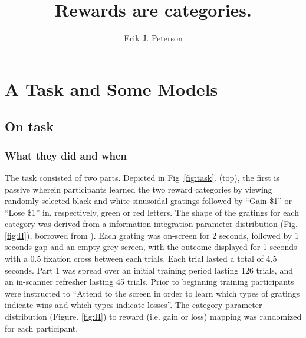 \documentclass[doc,12pt]{apa}        %
\title{Rewards are categories.}
\author{Erik J. Peterson} \affiliation{Dept. of Psychology \\ Colorado State University \\ Fort Collins, CO}
\begin{document}
 
\maketitle

\section{A Task and Some Models} %
\label{sec:task_and_models}

\subsection{On task}
\label{to_task}
\subsubsection{What they did and when}
\label{what_when}
The task consisted of two parts.  Depicted in Fig~\ref{fig:task}. (top), the first is passive wherein participants learned the two reward categories by viewing randomly selected black and white sinusoidal gratings followed by ``Gain \$1'' or ``Lose \$1'' in, respectively, green or red letters.  The shape of the gratings for each category was derived from a information integration parameter distribution (Fig. \ref{fig:II}), borrowed from \cite{Spiering:2008p5008}).  Each grating was on-screen for 2 seconds, followed by 1 seconds gap and an empty grey screen, with the outcome displayed for 1 seconds with a 0.5 fixation cross between each trials. Each trial lasted a total of 4.5 seconds. Part 1 was spread over an initial training period lasting 126 trials, and an in-scanner refresher lasting 45 trials.  Prior to beginning training participants were instructed to ``Attend to the screen in order to learn which types of gratings indicate wins and which types indicate losses''.  The category parameter distribution (Figure. \ref{fig:II}) to reward (i.e. gain or loss) mapping was randomized for each participant.
\end{document}
